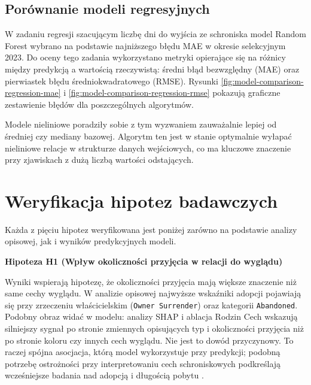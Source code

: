 \subsection{Porównanie modeli regresyjnych}

W zadaniu regresji szacującym liczbę dni do wyjścia ze schroniska model Random Forest wybrano na podstawie najniższego błędu MAE w okresie selekcyjnym 2023. Do oceny tego zadania wykorzystano metryki opierające się na różnicy między predykcją a wartością rzeczywistą: średni błąd bezwzględny (MAE) oraz pierwiastek błędu średniokwadratowego (RMSE). Rysunki \ref{fig:model-comparison-regression-mae} i \ref{fig:model-comparison-regression-rmse} pokazują graficzne zestawienie błędów dla poszczególnych algorytmów.



Modele nieliniowe poradziły sobie z tym wyzwaniem zauważalnie lepiej od średniej czy mediany bazowej. Algorytm ten jest w stanie optymalnie wyłapać nieliniowe relacje w strukturze danych wejściowych, co ma kluczowe znaczenie przy zjawiskach z dużą liczbą wartości odstających.

\section{Weryfikacja hipotez badawczych}
\label{sec:weryfikacja-hipotez-badawczych}

Każda z pięciu hipotez weryfikowana jest poniżej zarówno na podstawie analizy opisowej, jak i wyników predykcyjnych modeli.

\textbf{Hipoteza H1 (Wpływ okoliczności przyjęcia w relacji do wyglądu)}

Wyniki wspierają hipotezę, że okoliczności przyjęcia mają większe znaczenie niż same cechy wyglądu. W analizie opisowej najwyższe wskaźniki adopcji pojawiają się przy zrzeczeniu właścicielskim (\texttt{Owner Surrender}) oraz kategorii \texttt{Abandoned}. Podobny obraz widać w modelu: analizy SHAP i ablacja Rodzin Cech wskazują silniejszy sygnał po stronie zmiennych opisujących typ i okoliczności przyjęcia niż po stronie koloru czy innych cech wyglądu. Nie jest to dowód przyczynowy. To raczej spójna asocjacja, którą model wykorzystuje przy predykcji; podobną potrzebę ostrożności przy interpretowaniu cech schroniskowych podkreślają wcześniejsze badania nad adopcją i długością pobytu \cite{Bradley2021,Cain2020}.

